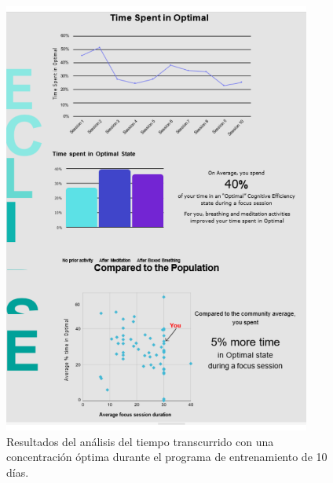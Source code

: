 \begin{figure}[H]
    \centering
    \includegraphics[width=0.9\textwidth]{img/ContourTimeSpent.pdf}
    \caption{Resultados del análisis del tiempo transcurrido con una concentración óptima durante el programa de entrenamiento de 10 días.}
    \label{fig: ContourTimeSpent}
    \end{figure}

